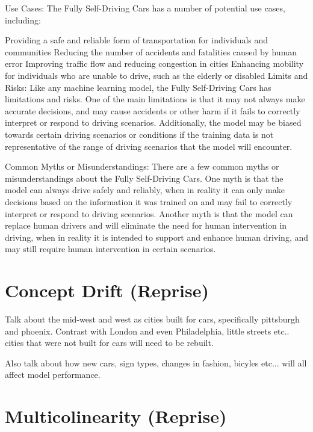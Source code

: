 Use Cases:
The Fully Self-Driving Cars has a number of potential use cases, including:

Providing a safe and reliable form of transportation for individuals and communities
Reducing the number of accidents and fatalities caused by human error
Improving traffic flow and reducing congestion in cities
Enhancing mobility for individuals who are unable to drive, such as the elderly or disabled
Limits and Risks:
Like any machine learning model, the Fully Self-Driving Cars has limitations and risks. One of the main limitations is that it may not always make accurate decisions, and may cause accidents or other harm if it fails to correctly interpret or respond to driving scenarios. Additionally, the model may be biased towards certain driving scenarios or conditions if the training data is not representative of the range of driving scenarios that the model will encounter.

Common Myths or Misunderstandings:
There are a few common myths or misunderstandings about the Fully Self-Driving Cars. One myth is that the model can always drive safely and reliably, when in reality it can only make decisions based on the information it was trained on and may fail to correctly interpret or respond to driving scenarios. Another myth is that the model can replace human drivers and will eliminate the need for human intervention in driving, when in reality it is intended to support and enhance human driving, and may still require human intervention in certain scenarios.

\section{Concept Drift (Reprise)}

Talk about the mid-west and west as cities built for cars, specifically pittsburgh and phoenix. Contrast with London and even Philadelphia, little streets etc.. cities that were not built for cars will need to be rebuilt.

Also talk about how new cars, sign types, changes in fashion, bicyles etc... will all affect model performance.

\section{Multicolinearity (Reprise)}


